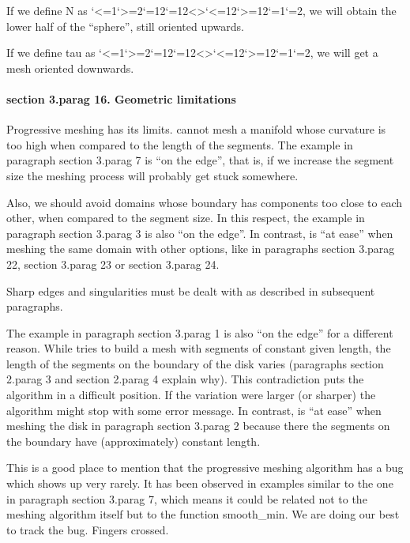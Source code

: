 If we define {\codett N} as \catcode`<=1\catcode`>=2\catcode`{=12\catcode`}=12<>\catcode`<=12\catcode`>=12\catcode`{=1\catcode`}=2, we will obtain
the lower half of the ``sphere'', still oriented upwards.

If we define {\codett tau} as \catcode`<=1\catcode`>=2\catcode`{=12\catcode`}=12<>\catcode`<=12\catcode`>=12\catcode`{=1\catcode`}=2, we will get a mesh
oriented downwards.


\paragraph{\numb section 3.\numb parag 16. Geometric limitations}

Progressive meshing has its limits.
{\ManiFEM} cannot mesh a manifold whose curvature is too high when compared to the
length of the segments.
The example in paragraph \numb section 3.\numb parag 7 is ``on the edge'', that is,
if we increase the segment size the meshing process will probably get stuck somewhere.

Also, we should avoid domains whose boundary has components too close to each other,
when compared to the segment size.
In this respect, the example in paragraph \numb section 3.\numb parag 3 is also
``on the edge''.
In contrast, {\maniFEM} is ``at ease'' when meshing the same domain with other options,
like in paragraphs \numb section 3.\numb parag 22, \numb section 3.\numb parag 23 or
\numb section 3.\numb parag 24.

Sharp edges and singularities must be dealt with as described in subsequent paragraphs.

The example in paragraph \numb section 3.\numb parag 1 is also ``on the edge''
for a different reason.
While {\maniFEM} tries to build a mesh with segments of constant given length,
the length of the segments on the boundary of the disk varies (paragraphs
\numb section 2.\numb parag 3 and \numb section 2.\numb parag 4 explain why).
This contradiction puts the algorithm in a difficult position.
If the variation were larger (or sharper) the algorithm might stop with some error message.
In contrast, {\maniFEM} is ``at ease'' when meshing the disk in paragraph
\numb section 3.\numb parag 2 because there the segments on the boundary have
(approximately) constant length.

This is a good place to mention that the progressive meshing algorithm has a bug
which shows up very rarely.
It has been observed in examples similar to the one in paragraph
\numb section 3.\numb parag 7, which means it could be related not to the meshing algorithm
itself but to the function {\codett smooth\_min}.
We are doing our best to track the bug. Fingers crossed.


